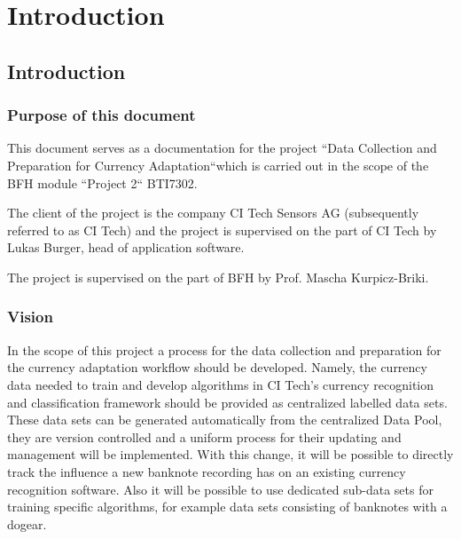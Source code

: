 \chapter{Introduction}
\label{chap:projectintroduction}

\section{Introduction}
\label{sec:introduction}

\subsection{Purpose of this document}
\label{sec:purpose}
This document serves as a documentation for the project ``Data Collection and Preparation for Currency Adaptation``which is carried out in the scope of the BFH module ``Project 2``  BTI7302. \par
The client of the project is the company CI Tech Sensors AG (subsequently referred to as CI Tech) and the project is supervised on the part of CI Tech by Lukas Burger, head of application software.

The project is supervised on the part of BFH by Prof. Mascha Kurpicz-Briki.

\subsection{Vision}
In the scope of this project a process for the data collection and preparation for the currency adaptation workflow should be developed.
Namely, the currency data needed to train and develop algorithms in CI Tech's currency recognition and classification framework should be provided as centralized labelled data sets. These data sets can be generated automatically from the centralized Data Pool, they are version controlled and a uniform process for their updating and management will be implemented.
With this change, it will be possible to directly track the influence a new banknote recording has on an existing currency recognition software. Also it will be possible to use dedicated sub-data sets for training specific algorithms, for example data sets consisting of banknotes with a dogear.